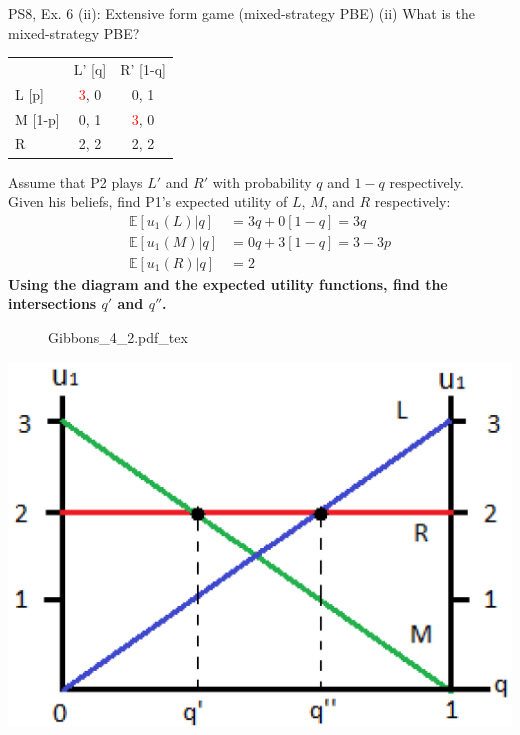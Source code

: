 \begin{frame}{PS8, Ex. 6 (ii): Extensive form game (mixed-strategy PBE)}
    (ii) What is the mixed-strategy PBE? \vspace{-8pt}
    \begin{multicols}{2}
      \begin{table}
        \begin{tabular}{l|c|c|}
          \multicolumn{1}{c}{} & \multicolumn{1}{c}{L' [q]} & \multicolumn{1}{c}{R' [1-q]} \\\cline{2-3}
          L [p]   & \textcolor{red}{3}, 0 & 0, \color{blue}1 \\\cline{2-3}
          M [1-p] & 0, \color{blue}1 & \textcolor{red}{3}, 0 \\\cline{2-3}
          R       & 2, \color{blue}2 & 2, \color{blue}2 \\\cline{2-3}
        \end{tabular}
      \end{table} \vspace{-4pt}
      Assume that P2 plays $L'$ and $R'$ with probability $q$ and $1-q$ respectively.\\\smallskip
      Given his beliefs, find P1's expected utility of $L$, $M$, and $R$ respectively: \vspace{-4pt}
      \begin{align*}
        \mathbb{E}[u_1(L)|q]&=3q+0[1-q]=3q\\
        \mathbb{E}[u_1(M)|q]&=0q+3[1-q]=3-3p\\
        \mathbb{E}[u_1(R)|q]&=2
      \end{align*}
      \textbf{Using the diagram and the expected utility functions, find the intersections $q'$ and $q''$.}
      \vfill\null\columnbreak
      \begin{figure}[!h]
        \center {}
        {Gibbons_4_2.pdf_tex}
      \end{figure}
      \includegraphics[width=1.1\columnwidth]{figures/Gibbons_4_2_E[u]}
      \vfill\null
    \end{multicols}
\end{frame}
